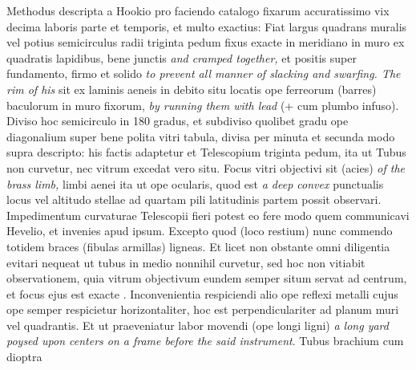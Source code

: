 Methodus descripta a Hookio pro faciendo catalogo fixarum accuratissimo vix decima laboris parte et temporis, et multo exactius: Fiat largus quadrans muralis vel potius semicirculus radii triginta pedum fixus exacte in meridiano\protect{} in muro ex quadratis lapidibus, bene junctis \textit{and cramped together,} et positis super fundamento, firmo et solido \textit{to prevent all manner of slacking and swarfing. The rim of his} sit ex laminis aeneis in debito situ locatis ope ferreorum (barres) baculorum in muro fixorum, \textit{by running them with lead} (+ cum plumbo infuso). Diviso hoc semicirculo in 180 gradus, et subdiviso quolibet gradu ope diagonalium super bene polita vitri tabula, divisa per minuta et secunda modo supra descripto: his factis adaptetur et Telescopium\protect{} triginta pedum, ita ut Tubus non curvetur, nec vitrum excedat vero situ. Focus vitri objectivi sit  (acies) \textit{of the brass limb,} limbi aenei ita ut ope ocularis\protect{}, quod est \textit{a deep convex} punctualis locus vel altitudo stellae ad quartam pili latitudinis partem possit observari. Impedimentum curvaturae Telescopii\protect{} fieri potest eo fere modo quem communicavi Hevelio\protect{}, et  invenies apud ipsum. Excepto quod  (loco restium) nunc commendo totidem braces (fibulas armillas) ligneas. Et licet non obstante omni diligentia evitari nequeat ut tubus in medio nonnihil curvetur, sed hoc non vitiabit observationem, quia vitrum objectivum eundem semper situm servat ad centrum, et focus ejus est exacte . Inconvenientia respiciendi  alio   ope reflexi metalli cujus ope semper respicietur horizontaliter, hoc est perpendiculariter ad planum muri vel quadrantis\protect{}. Et ut praeveniatur labor movendi (ope longi ligni)  \textit{a long yard poysed upon centers on a frame before the said instrument}. Tubus brachium cum dioptra\protect{} 